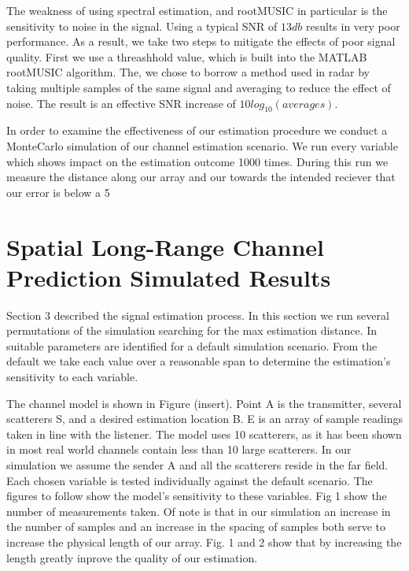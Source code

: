 \documentclass{allertonproc}
\begin{document}
The weakness of using spectral estimation, and rootMUSIC in particular is the sensitivity to noise in the signal. Using a typical SNR of $13db$ results in very poor performance. As a result, we take two steps to mitigate the effects of poor signal quality. First we use a threashhold value, which is built into the MATLAB rootMUSIC algorithm. The, we chose to borrow a method used in radar by taking multiple samples of the same signal and averaging to reduce the effect of noise. The result is an effective SNR increase of $10log_{10}(averages)$. 

In order to examine the effectiveness of our estimation procedure we conduct a MonteCarlo simulation of our channel estimation scenario. We run every variable which shows impact on the estimation outcome 1000 times. During this run we measure the distance along our array and our towards the intended reciever that our error is below a 5%


\section{Spatial Long-Range Channel Prediction Simulated Results}\label{simresults}

Section 3 described the signal estimation process. In this section we run several permutations of the simulation searching for the max estimation distance. In \cite{kckpVTC2015} suitable parameters are identified for a default simulation scenario.  %
From the default we take each value over a reasonable span to determine the estimation's sensitivity to each variable. 


The channel model is shown in Figure (insert). Point A is the transmitter, several scatterers S, and a desired estimation location B. E is an array of sample readings taken in line with the listener. The model uses 10 scatterers, as it has been shown in \cite{duel-hallen2000} most real world channels contain less than 10 large scatterers. In our simulation we assume the sender A and all the scatterers reside in the far field. 
Each chosen variable is tested individually against the default scenario. The figures to follow show the model's sensitivity to these variables. Fig 1 show the number of measurements taken. Of note is that in our simulation an increase in the number of samples and an increase in the spacing of samples both serve to increase the physical length of our array. Fig. 1 and 2 show that by increasing the length greatly inprove the quality of our estimation.
\end{document}
